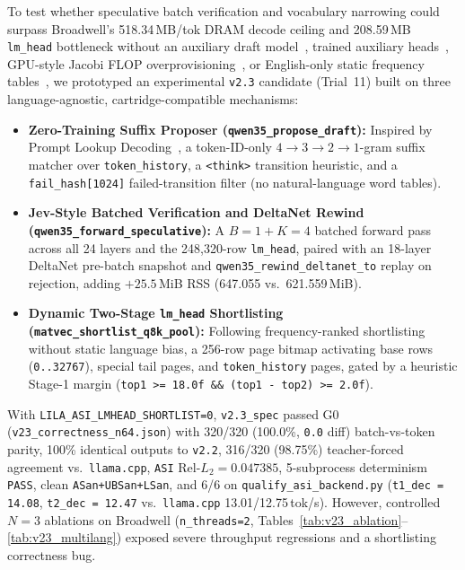 \documentclass[11pt,a4paper]{article}
\begin{document}
To test whether speculative batch verification and vocabulary narrowing could surpass Broadwell's 518.34\,MB/tok DRAM decode ceiling and 208.59\,MB \texttt{lm\_head} bottleneck without an auxiliary draft model~\cite{leviathan2023,chen2023}, trained auxiliary heads~\cite{cai2024}, GPU-style Jacobi FLOP overprovisioning~\cite{fu2024}, or English-only static frequency tables~\cite{zhao2025}, we prototyped an experimental \texttt{v2.3} candidate (Trial~11) built on three language-agnostic, cartridge-compatible mechanisms:
\begin{itemize}
    \item \textbf{Zero-Training Suffix Proposer (\texttt{qwen35\_propose\_draft}):} Inspired by Prompt Lookup Decoding~\cite{saxena2023}, a token-ID-only $4 \to 3 \to 2 \to 1$-gram suffix matcher over \texttt{token\_history}, a \texttt{<think>} transition heuristic, and a \texttt{fail\_hash[1024]} failed-transition filter (no natural-language word tables).
    \item \textbf{Jev-Style Batched Verification and DeltaNet Rewind (\texttt{qwen35\_forward\_speculative}):} A $B = 1 + K = 4$ batched forward pass across all 24 layers and the 248,320-row \texttt{lm\_head}, paired with an 18-layer DeltaNet pre-batch snapshot and \texttt{qwen35\_rewind\_deltanet\_to} replay on rejection, adding $+25.5$\,MiB RSS (647.055 vs.\ 621.559\,MiB).
    \item \textbf{Dynamic Two-Stage \texttt{lm\_head} Shortlisting (\texttt{matvec\_shortlist\_q8k\_pool}):} Following frequency-ranked shortlisting~\cite{zhao2025} without static language bias, a 256-row page bitmap activating base rows (\texttt{0..32767}), special tail pages, and \texttt{token\_history} pages, gated by a heuristic Stage-1 margin (\texttt{top1 >= 18.0f \&\& (top1 - top2) >= 2.0f}).
\end{itemize}

With \texttt{LILA\_ASI\_LMHEAD\_SHORTLIST=0}, \texttt{v2.3\_spec} passed G0 (\texttt{v23\_correctness\_n64.json}) with 320/320 (100.0\%, \texttt{0.0} diff) batch-vs-token parity, 100\% identical outputs to \texttt{v2.2}, 316/320 (98.75\%) teacher-forced agreement vs.\ \texttt{llama.cpp}, \texttt{ASI} Rel-$L_2 = 0.047385$, 5-subprocess determinism \texttt{PASS}, clean \texttt{ASan+UBSan+LSan}, and 6/6 on \texttt{qualify\_asi\_backend.py} (\texttt{t1\_dec = 14.08}, \texttt{t2\_dec = 12.47} vs.\ \texttt{llama.cpp} 13.01/12.75\,tok/s). However, controlled $N=3$ ablations on Broadwell (\texttt{n\_threads=2}, Tables~\ref{tab:v23_ablation}--\ref{tab:v23_multilang}) exposed severe throughput regressions and a shortlisting correctness bug.
\end{document}
